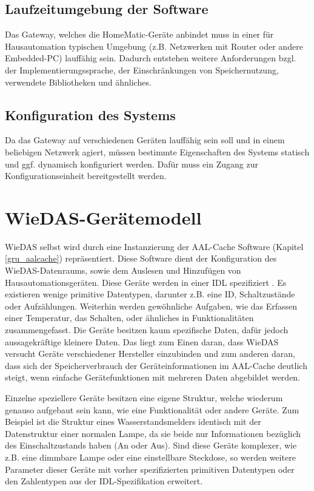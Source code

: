 \subsection{Laufzeitumgebung der Software}

Das Gateway, welches die HomeMatic-Geräte anbindet muss in einer für Hausautomation typischen
Umgebung (z.B. Netzwerken mit Router oder andere Embedded-PC) lauffähig sein.
Dadurch entstehen weitere Anforderungen bzgl. der Implementierungssprache, der Einschränkungen
von Speichernutzung, verwendete Bibliotheken und ähnliches.

\subsection{Konfiguration des Systems}

Da das Gateway auf verschiedenen Geräten lauffähig sein soll und in einem beliebigen Netzwerk
agiert, müssen bestimmte Eigenschaften des Systems statisch und ggf. dynamisch konfiguriert werden.
Dafür muss ein Zugang zur Konfigurationseinheit bereitgestellt werden.

\section{WieDAS-Gerätemodell}
\label{ana_wd_modell}

WieDAS selbst wird durch eine Instanzierung der AAL-Cache Software (Kapitel \ref{gru_aalcache})
repräsentiert.
Diese Software dient der Konfiguration des WieDAS-Datenraums, sowie dem Auslesen und Hinzufügen von
Hausautomationsgeräten.
Diese Geräte werden in einer IDL \cite{idl} spezifiziert \cite{wiedas_idl}.
Es existieren wenige primitive Datentypen, darunter z.B. eine ID, Schaltzustände oder Aufzählungen.
Weiterhin werden gewöhnliche Aufgaben, wie das Erfassen einer Temperatur, das Schalten, oder ähnliches
in Funktionalitäten zusammengefasst.
Die Geräte besitzen kaum spezifische Daten, dafür jedoch aussagekräftige kleinere Daten.
Das liegt zum Einen daran, dass WieDAS versucht Geräte verschiedener Hersteller einzubinden und zum
anderen daran, dass sich der Speicherverbrauch der Geräteinformationen im AAL-Cache deutlich steigt,
wenn einfache Gerätefunktionen mit mehreren Daten abgebildet werden.

Einzelne speziellere Geräte besitzen eine eigene Struktur, welche wiederum genauso aufgebaut sein
kann, wie eine Funktionalität oder andere Geräte.
Zum Beispiel ist die Struktur eines Wasserstandsmelders identisch mit der Datenstruktur einer
normalen Lampe, da sie beide nur Informationen bezüglich des Einschaltzustands haben (An oder Aus).
Sind diese Geräte komplexer, wie z.B. eine dimmbare Lampe oder eine einstellbare Steckdose, so werden
weitere Parameter dieser Geräte mit vorher spezifizierten primitiven Datentypen oder den
Zahlentypen aus der IDL-Spezifikation erweitert.

